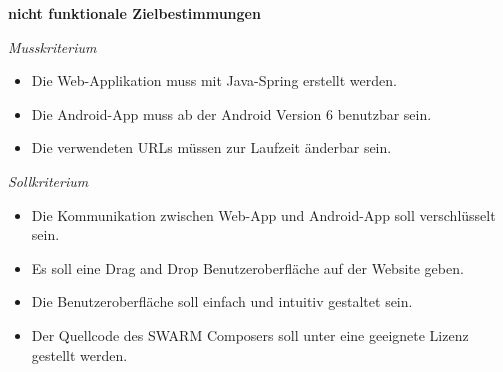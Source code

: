 \textbf{nicht funktionale Zielbestimmungen}\newline

\textit{Musskriterium}

\begin{itemize}[leftmargin=4pc]
	\item Die Web-Applikation muss mit Java-Spring erstellt werden.
	\item Die Android-App muss ab der Android Version 6 benutzbar sein.
	\item Die verwendeten URLs müssen zur Laufzeit änderbar sein.
\end{itemize}

\textit{Sollkriterium}

\begin{itemize}[leftmargin=4pc]
	\item Die Kommunikation zwischen Web-App und Android-App soll verschlüsselt sein.
	\item Es soll eine Drag and Drop Benutzeroberfläche auf der Website geben.
	\item Die Benutzeroberfläche soll einfach und intuitiv gestaltet sein.
	\item Der Quellcode des SWARM Composers soll unter eine geeignete Lizenz gestellt werden.
\end{itemize}

